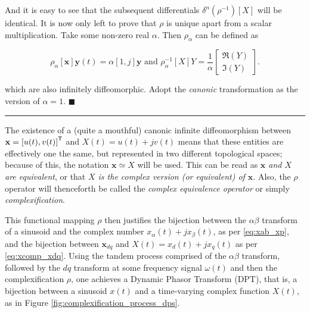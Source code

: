 	And it is easy to see that the subsequent differentials $\delta^n\left(\rho^{-1}\right)\left[X\right]$ will be identical. It is now only left to prove that $\rho$ is unique apart from a scalar multiplication. Take some non-zero real $\alpha$. Then $\rho_\alpha$ can be defined as

\begin{equation} \rho_\alpha\left[\mathbf{x}\right] \mathbf{y}(t) = \alpha\left[1,j\right]\mathbf{y} \text{ and } \rho^{-1}_\alpha\left[X\right] Y= \dfrac{1}{\alpha}\left[\begin{array}{c} \Re\left(Y\right)\\[3mm] \Im\left(Y\right)\end{array}\right]. \end{equation}

	\noindent which are also infinitely diffeomorphic. Adopt the \textit{canonic} transformation as the version of $\alpha = 1$. \hfill$\blacksquare$

\vspace{5mm}
\hrule
\vspace{5mm}

	The existence of a (quite a mouthful) canonic infinite diffeomorphism between $\mathbf{x} = \left[u(t),v(t)\right]^{\mathsf{T}}$ and $X(t) = u(t) + jv(t)$ means that these entities are effectively one the same, but represented in two different topological spaces; because of this, the notation $\mathbf{x} \simeq X$ will be used. This can be read as \textit{$\mathbf{x}$ and $X$ are equivalent}, or that \textit{$X$ is the complex version (or equivalent) of $\mathbf{x}$}. Also, the $\rho$ operator will thenceforth be called the \textit{complex equivalence operator} or simply \textit{complexification}.

	This functional mapping $\rho$ then justifies the bijection between the $\alpha\beta$ transform of a sinusoid and the complex number $x_\alpha(t) + jx_\beta(t)$, as per \eqref{eq:xab_xp}, and the bijection between $\mathbf{x}_{dq}$ and $X(t) = x_d(t) + jx_q(t)$ as per \eqref{eq:xcomp_xdq}. Using the tandem process comprised of the $\alpha\beta$ transform, followed by the $dq$ transform at some frequency signal $\omega(t)$ and then the complexification $\rho$, one achieves a Dynamic Phasor Transform (DPT), that is, a bijection between a sinusoid $x(t)$ and a time-varying complex function $X(t)$, as in Figure \ref{fig:complexification_process_dps}.

